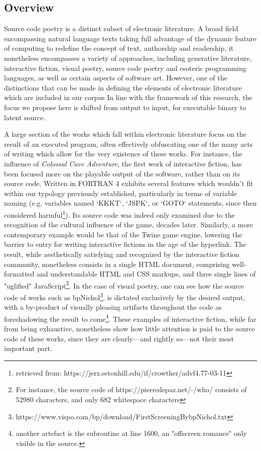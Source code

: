\documentclass{article}
\begin{document}
\subsection{Overview}

Source code poetry is a distinct subset of electronic literature. A broad field encompassing natural language texts taking full advantage of the dynamic feature of computing to redefine the concept of text, authorship and readership, it nonetheless encompasses a variety of approaches, including generative literature, interactive fiction, visual poetry, source code poetry and esoteric programming languages, as well as certain aspects of software art. However, one of the distinctions that can be made in defining the elements of electronic literature which are included in our corpus In line with the framework of this research, the focus we propose here is shifted from output to input, for executable binary to latent source.

A large section of the works which fall within electronic literature focus on the result of an executed program, often effectively obfuscating one of the many acts of writing which allow for the very existence of these works. For instance, the influence of \emph{Colossal Cave Adventure}\cite{crowthers_colossal_1977}, the first work of interactive fiction, has been focused more on the playable output of the software, rather than on its source code. Written in FORTRAN 4 exhibits several features which wouldn't fit within our typology previously established, particularly in terms of variable naming (e.g. variables named `KKKT`, `JSPK`, or `GOTO` statements, since then considered harmful\footnote{retrieved from: https://jerz.setonhill.edu/if/crowther/advf4.77-03-11}). Its source code was indeed only examined due to the recognition of the cultural influence of the game, decades later. Similarly, a more contemporary example would be that of the Twine game engine, lowering the barrier to entry for writing interactive fictions in the age of the hyperlink. The result, while aesthetically satisfying and recognized by the interactive fiction community, nonetheless consists in a single HTML document, comprising well-formatted and understandable HTML and CSS markups, and three single lines of "uglified" JavaScript\footnote{For instance, the source code of https://pierredepaz.net/-/who/ consists of 52980 characters, and only 682 whitespace characters}. In the case of visual poetry, one can see how the source code of works such as bpNichol\footnote{https://www.vispo.com/bp/download/FirstScreeningBybpNichol.txt}, is dictated exclusively by the desired output, with a by-product of visually pleasing artifacts throughout the code as foreshadowing the result to come\footnote{another artefact is the subroutine at line 1600, an "offscreen romance" only visible in the source.}. These examples of interactive fiction, while far from being exhaustive, nonetheless show how little attention is paid to the source code of these works, since they are clearly—and rightly so—not their most important part.
\end{document}
